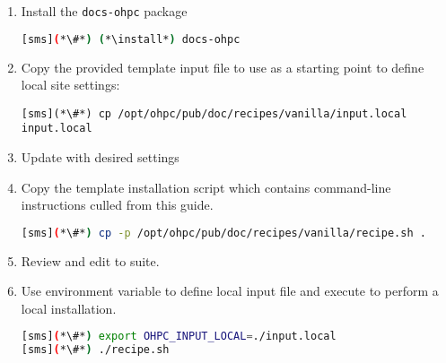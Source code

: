 \begin{enumerate}
\item Install the \texttt{docs-ohpc} package

\begin{lstlisting}[language=bash,keywords={}]
[sms](*\#*) (*\install*) docs-ohpc
\end{lstlisting}

\item Copy the provided template input file to use as a starting point to
  define local site settings:
\begin{lstlisting}
[sms](*\#*) cp /opt/ohpc/pub/doc/recipes/vanilla/input.local input.local
\end{lstlisting}

\item Update  with desired settings

\item Copy the template installation script which contains command-line
  instructions culled from this guide.

\begin{lstlisting}[language=bash,keywords={}]
[sms](*\#*) cp -p /opt/ohpc/pub/doc/recipes/vanilla/recipe.sh .
\end{lstlisting}

\item Review and edit  to suite.

\item Use environment variable to define local input file and execute
   to perform a local installation.

\begin{lstlisting}[language=bash,keywords={}]
[sms](*\#*) export OHPC_INPUT_LOCAL=./input.local
[sms](*\#*) ./recipe.sh
\end{lstlisting}
\end{enumerate}
